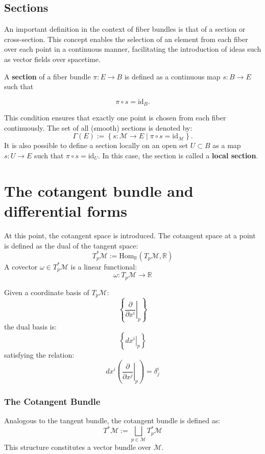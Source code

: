\subsection{Sections}

An important definition in the context of fiber bundles is that of a section or cross-section. This concept enables the selection of an element from each fiber over each point in a continuous manner, facilitating the introduction of ideas such as vector fields over spacetime\cite{NakaharaGeometrytopologyphysics2005}.

A \textbf{section} of a fiber bundle \(\pi : E \to B\) is defined as a continuous map \(s: B \to E\) such that

\[
\pi \circ s = \mathrm{id}_B.
\]

This condition ensures that exactly one point is chosen from each fiber continuously. 
The set of all (smooth) sections is denoted by:
\[
\Gamma(E) := \left\{ s: \mathcal{M} \to E \mid \pi \circ s = \mathrm{id}_{\mathcal{M}} \right\}.
\]
It is also possible to define a section locally on an open set \(U \subset B\) as a map \(s: U \to E\) such that \(\pi \circ s = \mathrm{id}_U\). In this case, the section is called a \textbf{local section}.


\section{The cotangent bundle and differential forms}


At this point, the cotangent space is introduced. The cotangent space at a point is defined as the dual of the tangent space:
\[
T_p^*\mathcal{M} := \text{Hom}_\mathbb{R}(T_p \mathcal{M}, \mathbb{R})
\]
A covector \(\omega \in T_p^*\mathcal{M}\) is a linear functional:
\[
\omega: T_p \mathcal{M} \to \mathbb{R}
\]

Given a coordinate basis of \(T_p \mathcal{M}\):
\[
\left\{ \left. \frac{\partial}{\partial x^i} \right|_p \right\}
\]
the dual basis is:
\[
\left\{ \left. dx^i \right|_p \right\}
\]
satisfying the relation:
\[
dx^i\left( \left. \frac{\partial}{\partial x^j} \right|_p \right) = \delta^i_j
\]
\subsubsection*{The Cotangent Bundle}

Analogous to the tangent bundle, the cotangent bundle is defined as:
\[
T^*\mathcal{M} := \bigsqcup_{p \in \mathcal{M}} T_p^* \mathcal{M}
\]
This structure constitutes a vector bundle over \(\mathcal{M}\).

